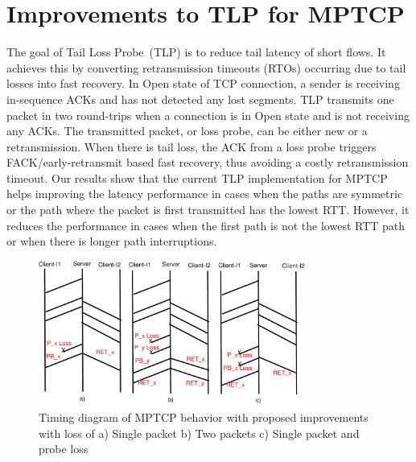 \documentclass[10pt,conference]{IEEEtran}
\begin{document}
\section{Improvements to TLP for MPTCP}\label{impr}
The goal of Tail Loss Probe~(TLP) is to reduce tail latency of short flows. It achieves this by converting retransmission timeouts (RTOs) occurring
due to tail losses into fast recovery. In Open state of TCP connection, a sender is receiving in-sequence ACKs and has not detected any lost segments.
TLP transmits one packet in two round-trips when a connection is in Open state and is not receiving any ACKs. The transmitted packet, or loss probe, 
can be either new or a retransmission. When there is tail loss, the ACK from a loss probe triggers FACK/early-retransmit based fast recovery, thus 
avoiding a costly retransmission timeout. Our results show that the current TLP implementation for MPTCP helps improving the latency performance in 
cases when the paths are symmetric or the path where the packet is first transmitted has the lowest RTT. However, it reduces the performance in cases when the first path 
is not the lowest RTT path or when there is longer path interruptions.

\begin{figure}
\begin{center}
    \includegraphics[angle=0, width=0.8\textwidth]{images/timingER3NewTLP1}
\end{center}
\caption{Timing diagram of MPTCP behavior with proposed improvements with loss of a) Single packet b) Two packets c) Single packet and probe loss}\label{timingNew}
\end{figure}
\end{document}

